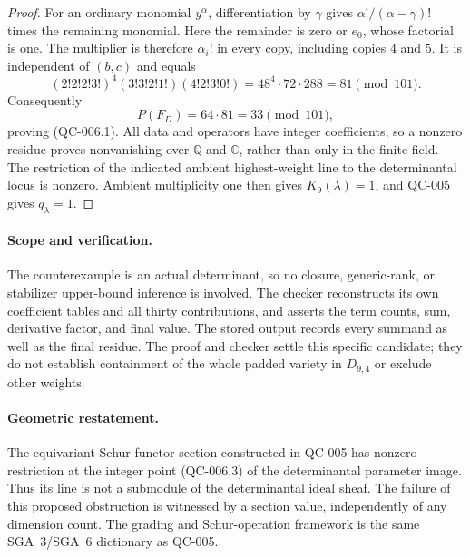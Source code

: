 \begin{proof}
For an ordinary monomial $y^\alpha$, differentiation by
$\gamma$ gives $\alpha!/(\alpha-\gamma)!$ times the
remaining monomial. Here the remainder is zero or $e_0$,
whose factorial is one. The multiplier is therefore
$\alpha_i!$ in every copy, including copies $4$ and $5$.
It is independent of $(b,c)$ and equals
\[
 (2!2!2!3!)^4(3!3!2!1!)(4!2!3!0!)
 =48^4\cdot72\cdot288
 =81\pmod {101}.
 \tag{QC-006.13}
\]
Consequently
\[
 P(F_D)=64\cdot81=33\pmod {101},
 \tag{QC-006.14}
\]
proving (QC-006.1). All data and operators have integer
coefficients, so a nonzero residue proves nonvanishing over
$\mathbb Q$ and $\mathbb C$, rather than only in the finite
field. The restriction of the indicated ambient highest-weight
line to the determinantal locus is nonzero. Ambient
multiplicity one then gives $K_9(\lambda)=1$, and QC-005
gives $q_\lambda=1$.
\end{proof}

\paragraph{Scope and verification.}
The counterexample is an actual determinant, so no closure,
generic-rank, or stabilizer upper-bound inference is involved.
The checker reconstructs its own coefficient tables and all
thirty contributions, and asserts the term counts, sum,
derivative factor, and final value. The stored output records
every summand as well as the final residue. The proof and
checker settle this specific candidate; they do not establish
containment of the whole padded variety in $D_{9,4}$ or exclude
other weights.

\paragraph{Geometric restatement.}
The equivariant Schur-functor section constructed in QC-005
has nonzero restriction at the integer point (QC-006.3) of the
determinantal parameter image. Thus its line is not a submodule
of the determinantal ideal sheaf. The failure of this proposed
obstruction is witnessed by a section value, independently of
any dimension count. The grading and Schur-operation framework
is the same SGA~3/SGA~6 dictionary as QC-005.
